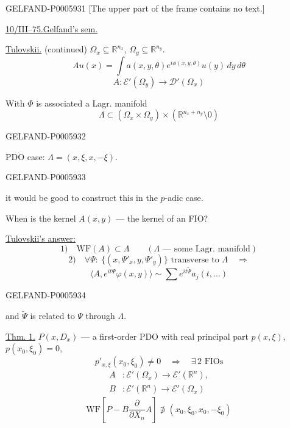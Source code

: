 \begin{GelfandAdjacentEvidence}{GELFAND-P000593}{1}
[The upper part of the frame contains no text.]

\underline{10/III--75.}\qquad \underline{Gelfand's sem.}

\underline{Tulovskii.} (continued)
\(\Omega_x\subseteq\mathbb R^{n_x}\), \(\Omega_y\subseteq\mathbb R^{n_y}\).
\[
Au(x)=\int a(x,y,\theta)e^{i\phi(x,y,\theta)}u(y)\,dy\,d\theta
\]
\[
A:\mathcal E'(\Omega_y)\longrightarrow\mathcal D'(\Omega_x)
\]

With \(\Phi\) is associated a Lagr. manifold
\[
\Lambda\subset(\Omega_x\times\Omega_y)\times(\mathbb R^{n_x+n_y}\setminus0)
\]
\end{GelfandAdjacentEvidence}
\begin{GelfandAdjacentEvidence}{GELFAND-P000593}{2}

PDO case: \(\Lambda=(x,\xi,x,-\xi)\).
\end{GelfandAdjacentEvidence}
\begin{GelfandAdjacentEvidence}{GELFAND-P000593}{3}


 it would be good to construct this in the \(p\)-adic case.

When is the kernel \(A(x,y)\) — the kernel of an FIO?

\underline{Tulovskii's answer:}
\[
1)\quad \mathrm{WF}(A)\subset\Lambda\qquad (\Lambda\text{ — some Lagr. manifold})
\]
\[
2)\quad\forall\Psi:\ \{(x,\Psi'_x,y,\Psi'_y)\}\text{ transverse to }\Lambda
\quad\Rightarrow
\]
\[
\langle A,e^{it\Psi}\varphi(x,y)\rangle\sim
\sum e^{it\widetilde\Psi}a_j(t,\ldots)
\]
\end{GelfandAdjacentEvidence}
\begin{GelfandAdjacentEvidence}{GELFAND-P000593}{4}

and \(\widetilde\Psi\) is related to \(\Psi\) through \(\Lambda\).

\underline{\underline{Thm. 1.}}
\(P(x,D_x)\) — a first-order PDO with real principal part \(p(x,\xi)\), \(p(x_0,\xi_0)=0\),
\[
p'_{x,\xi}(x_0,\xi_0)\ne0\quad\Rightarrow\quad\exists\,2\text{ FIOs}
\]
\[
\begin{aligned}
A&:\mathcal E'(\Omega_x)\longrightarrow\mathcal E'(\mathbb R^n),\\
B&:\mathcal E'(\mathbb R^n)\longrightarrow\mathcal E'(\Omega_x)
\end{aligned}
\]
\[
\mathrm{WF}\left[P-B\frac{\partial}{\partial X_n}A\right]
\not\ni(x_0,\xi_0,x_0,-\xi_0)
\]
\end{GelfandAdjacentEvidence}
